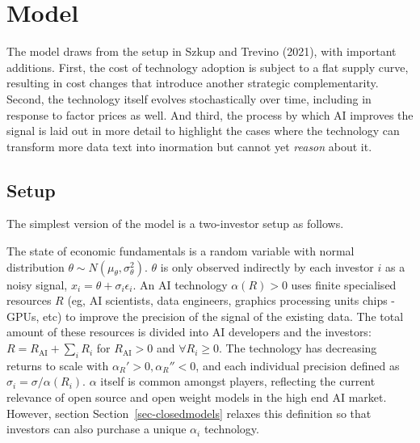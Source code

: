 \documentclass[
]{article}
\theoremstyle{plain}
\theoremstyle{remark}
\begin{document}
\hypertarget{model}{%
\section{Model}\label{model}}

The model draws from the setup in Szkup and Trevino (2021), with
important additions. First, the cost of technology adoption is subject
to a flat supply curve, resulting in cost changes that introduce another
strategic complementarity. Second, the technology itself evolves
stochastically over time, including in response to factor prices as
well. And third, the process by which AI improves the signal is laid out
in more detail to highlight the cases where the technology can transform
more data text into inormation but cannot yet \emph{reason} about it.

\hypertarget{setup}{%
\subsection{Setup}\label{setup}}

The simplest version of the model is a two-investor setup as follows.

The state of economic fundamentals is a random variable with normal
distribution \(\theta \sim N(\mu_\theta, \sigma_\theta^2)\). \(\theta\)
is only observed indirectly by each investor \(i\) as a noisy signal,
\(x_i = \theta + \sigma_i \epsilon_i\). An AI technology
\(\alpha(R) > 0\) uses finite specialised resources \(R\) (eg, AI
scientists, data engineers, graphics processing units chips - GPUs, etc)
to improve the precision of the signal of the existing data. The total
amount of these resources is divided into AI developers and the
investors: \(R = R_{\text{AI}} + \sum_{i} R_i\) for
\(R_{\text{AI}} > 0\) and \(\forall R_i \geq 0\). The technology has
decreasing returns to scale with \(\alpha_R' > 0, \alpha_R'' < 0\), and
each individual precision defined as
\(\sigma_i = \sigma / \alpha(R_i)\). \(\alpha\) itself is common amongst
players, reflecting the current relevance of open source and open weight
models in the high end AI market. However, section
Section~\ref{sec-closedmodels} relaxes this definition so that investors
can also purchase a unique \(\alpha_i\) technology.
\end{document}
